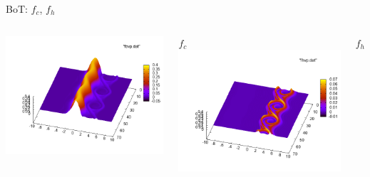 \documentclass{beamer}
\begin{document}
  \begin{frame}{BoT: $f_c$, $f_h$}
  	\begin{columns}[c]
        \includegraphics[width=\textwidth]{img/fbvp.png}

        $f_c$
        \includegraphics[width=\textwidth]{img/fhvp.png}

        $f_h$
    \end{columns}
  \end{frame}
\end{document}
